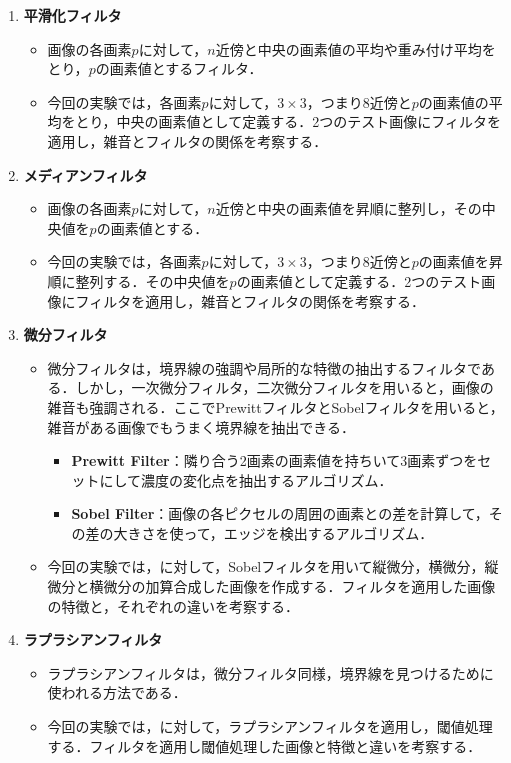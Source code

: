 \begin{enumerate}
    \item \textbf{平滑化フィルタ}
          \begin{itemize}
              \item 画像の各画素\(p\)に対して，\(n\)近傍と中央の画素値の平均や重み付け平均をとり，\(p\)の画素値とするフィルタ．
              \item 今回の実験では，各画素\(p\)に対して，\(3\times 3\)，つまり8近傍と\(p\)の画素値の平均をとり，中央の画素値として定義する．2つのテスト画像にフィルタを適用し，雑音とフィルタの関係を考察する．
          \end{itemize}
    \item \textbf{メディアンフィルタ}
          \begin{itemize}
              \item 画像の各画素\(p\)に対して，\(n\)近傍と中央の画素値を昇順に整列し，その中央値を\(p\)の画素値とする．
              \item 今回の実験では，各画素\(p\)に対して，\(3\times 3\)，つまり8近傍と\(p\)の画素値を昇順に整列する．その中央値を\(p\)の画素値として定義する．2つのテスト画像にフィルタを適用し，雑音とフィルタの関係を考察する．
          \end{itemize}
    \item \textbf{微分フィルタ}
          \begin{itemize}
              \item 微分フィルタは，境界線の強調や局所的な特徴の抽出するフィルタである．しかし，一次微分フィルタ，二次微分フィルタを用いると，画像の雑音も強調される．ここでPrewittフィルタとSobelフィルタを用いると，雑音がある画像でもうまく境界線を抽出できる\cite[p.87]{画像処理}．
                    \begin{itemize}
                        \item \textbf{Prewitt Filter}：隣り合う2画素の画素値を持ちいて3画素ずつをセットにして濃度の変化点を抽出するアルゴリズム\cite[p.87]{画像処理}．
                        \item \textbf{Sobel Filter}：画像の各ピクセルの周囲の画素との差を計算して，その差の大きさを使って，エッジを検出するアルゴリズム．
                    \end{itemize}
              \item 今回の実験では，\originimg に対して，Sobelフィルタを用いて縦微分，横微分，縦微分と横微分の加算合成した画像を作成する．フィルタを適用した画像の特徴と，それぞれの違いを考察する．
          \end{itemize}
    \item \textbf{ラプラシアンフィルタ}
          \begin{itemize}
              \item ラプラシアンフィルタは，微分フィルタ同様，境界線を見つけるために使われる方法である．
              \item 今回の実験では，\originimg に対して，ラプラシアンフィルタを適用し，閾値処理する．フィルタを適用し閾値処理した画像と特徴と違いを考察する．
          \end{itemize}
\end{enumerate}
